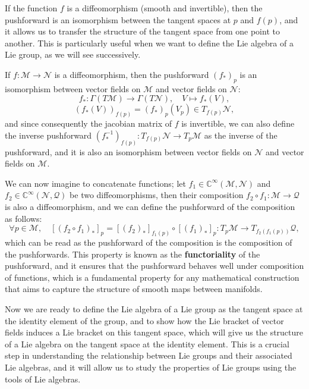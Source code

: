 If the function \(f\) is a diffeomorphism (smooth and invertible), then the pushforward is an isomorphism between the tangent spaces at \(p\) and \(f(p)\), and it allows us to transfer the structure of the tangent space from one point to another. This is particularly useful when we want to define the Lie algebra of a Lie group, as we will see successively.

\begin{proposition}
    If \(f : \mathcal{M} \to \mathcal{N}\) is a diffeomorphism, then the pushforward \((f_*)_p\) is an isomorphism between vector fields on \(\mathcal{M}\) and vector fields on \(\mathcal{N}\):
    \[
        f_* : \Gamma(T\mathcal{M}) \to \Gamma(T\mathcal{N}), \quad V \mapsto f_*(V),
    \]
    \[
        (f_*(V))_{f(p)} = (f_*)_p(V_p) \in T_{f(p)} \mathcal{N},
    \]
    and since consequently the jacobian matrix of \(f\) is invertible, we can also define the inverse pushforward \((f^{-1}_*)_{f(p)} : T_{f(p)} \mathcal{N} \to T_p \mathcal{M}\) as the inverse of the pushforward, and it is also an isomorphism between vector fields on \(\mathcal{N}\) and vector fields on \(\mathcal{M}\).
\end{proposition}

We can now imagine to concatenate functions; let \(f_1 \in \mathbb{C}^{\infty}(\mathcal{M}, \mathcal{N})\) and \(f_2 \in \mathbb{C}^{\infty}(\mathcal{N}, \mathcal{Q})\) be two diffeomorphisms, then their composition \(f_2 \circ f_1 : \mathcal{M} \to \mathcal{Q}\) is also a diffeomorphism, and we can define the pushforward of the composition as follows:
\[
    \forall p \in \mathcal{M}, \quad [(f_2 \circ f_1)_*]_p = [(f_2)_*]_{f_1(p)} \circ [(f_1)_*]_p : T_p \mathcal{M} \to T_{f_2(f_1(p))} \mathcal{Q},
\]
which can be read as the pushforward of the composition is the composition of the pushforwards. This property is known as the \textbf{functoriality} of the pushforward, and it ensures that the pushforward behaves well under composition of functions, which is a fundamental property for any mathematical construction that aims to capture the structure of smooth maps between manifolds.

Now we are ready to define the Lie algebra of a Lie group as the tangent space at the identity element of the group, and to show how the Lie bracket of vector fields induces a Lie bracket on this tangent space, which will give us the structure of a Lie algebra on the tangent space at the identity element. This is a crucial step in understanding the relationship between Lie groups and their associated Lie algebras, and it will allow us to study the properties of Lie groups using the tools of Lie algebras.

